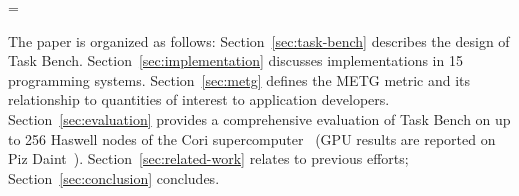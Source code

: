 \brokenpenalty=\oldbrokenpenalty




The paper is organized as follows: Section~\ref{sec:task-bench}
describes the design of Task Bench. Section~\ref{sec:implementation}
discusses implementations in 15 programming systems.
Section~\ref{sec:metg} defines the METG metric and its
relationship to quantities of interest to application developers.
Section~\ref{sec:evaluation} provides a comprehensive evaluation of
Task Bench on up to 256 Haswell nodes of the Cori
supercomputer~\cite{Cori} (GPU results are reported on Piz Daint~\cite{PizDaint}). Section~\ref{sec:related-work} relates to previous efforts; Section~\ref{sec:conclusion} concludes.
